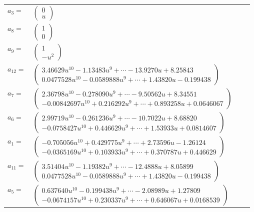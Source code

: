 \documentclass[1p]{elsarticle_modified}
\theoremstyle{definition}
\begin{document}
\begin{tabular}{m{7pt} m{180pt} m{7pt} m{180pt} }
\flushright $a_{3}=$&$\begin{pmatrix}0\\u\end{pmatrix}$ \\
\flushright $a_{8}=$&$\begin{pmatrix}1\\0\end{pmatrix}$ \\
\flushright $a_{9}=$&$\begin{pmatrix}1\\- u^2\end{pmatrix}$ \\
\flushright $a_{12}=$&$\begin{pmatrix}3.46629 u^{10}-1.13483 u^{9}+\cdots-13.9270 u+8.25843\\0.0477528 u^{10}-0.0589888 u^{9}+\cdots+1.43820 u-0.199438\end{pmatrix}$ \\
\flushright $a_{7}=$&$\begin{pmatrix}2.36798 u^{10}-0.278090 u^{9}+\cdots-9.50562 u+8.34551\\-0.00842697 u^{10}+0.216292 u^{9}+\cdots+0.893258 u+0.0646067\end{pmatrix}$ \\
\flushright $a_{6}=$&$\begin{pmatrix}2.99719 u^{10}-0.261236 u^{9}+\cdots-10.7022 u+8.68820\\-0.0758427 u^{10}+0.446629 u^{9}+\cdots+1.53933 u+0.0814607\end{pmatrix}$ \\
\flushright $a_{1}=$&$\begin{pmatrix}-0.705056 u^{10}+0.429775 u^{9}+\cdots+2.73596 u-1.26124\\-0.0365169 u^{10}+0.103933 u^{9}+\cdots+0.370787 u+0.446629\end{pmatrix}$ \\
\flushright $a_{11}=$&$\begin{pmatrix}3.51404 u^{10}-1.19382 u^{9}+\cdots-12.4888 u+8.05899\\0.0477528 u^{10}-0.0589888 u^{9}+\cdots+1.43820 u-0.199438\end{pmatrix}$ \\
\flushright $a_{5}=$&$\begin{pmatrix}0.637640 u^{10}-0.199438 u^{9}+\cdots-2.08989 u+1.27809\\-0.0674157 u^{10}+0.230337 u^{9}+\cdots+0.646067 u+0.0168539\end{pmatrix}$ \\

\end{tabular}
\end{document}
